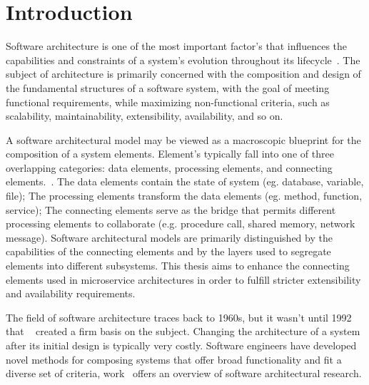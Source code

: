 
%

\chapter{Introduction}
\label{cha:introduction}

Software architecture is one of the most important factor's that influences the capabilities and constraints of a system's evolution throughout its lifecycle~\cite{Breivold2012}.
The subject of architecture is primarily concerned with the composition and design of the fundamental structures of a software system,
with the goal of meeting functional requirements, while maximizing non-functional criteria, such as scalability, maintainability, extensibility, availability, and so on.

A software architectural model may be viewed as a macroscopic blueprint for the composition of a system elements.
Element's typically fall into one of three overlapping categories: data elements, processing elements, and connecting elements.~\cite{architecture}.
The data elements contain the state of system (eg. database, variable, file);
The processing elements transform the data elements (eg. method, function, service);
The connecting elements serve as the bridge that permits different processing elements to collaborate (e.g. procedure call, shared memory, network message).
Software architectural models are primarily distinguished by the capabilities of the connecting elements and by the layers used to segregate elements into different subsystems.
This thesis aims to enhance the connecting elements used in microservice architectures in order to fulfill stricter extensibility and availability requirements.

The field of software architecture traces back to 1960s, but it wasn't until 1992 that \citeauthor{architecture}~\cite{architecture} created a firm basis on the subject.
Changing the architecture of a system after its initial design is typically very costly.
Software engineers have developed novel methods for composing systems that offer broad functionality and fit a diverse set of criteria, \citeauthor{3} work~\cite{3, 4} offers an overview of software architectural research.

